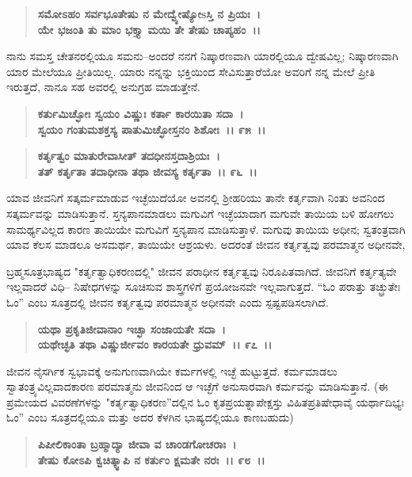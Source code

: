 \begin{verse}
\textbf{ಸಮೋಽಹಂ ಸರ್ವಭೂತೇಷು ನ ಮೇದ್ವ್ಯೇಷ್ಯೋsಸ್ತಿ ನ ಪ್ರಿಯಃ~।}\\\textbf{ಯೇ ಭಜಂತಿ ತು ಮಾಂ ಭಕ್ತ್ಯಾ ಮಯಿ ತೇ ತೇಷು ಚಾಪ್ಯಹಂ~।।} 
\end{verse}

ನಾನು ಸಮಸ್ತ ಚೇತನರಲ್ಲಿಯೂ ಸಮನು–ಅಂದರೆ ನನಗೆ ನಿಷ್ಕಾರಣವಾಗಿ ಯಾರಲ್ಲಿಯೂ ದ್ವೇಷವಿಲ್ಲ; ನಿಷ್ಕಾರಣವಾಗಿ ಯಾರ ಮೇಲೆಯೂ ಪ್ರೀತಿಯಿಲ್ಲ. ಯಾರು ನನ್ನನ್ನು ಭಕ್ತಿಯಿಂದ ಸೇವಿಸುತ್ತಾರೆಯೋ ಅವರಿಗೆ ನನ್ನ ಮೇಲೆ ಪ್ರೀತಿ ಇರುತ್ತದೆ, ನಾನೂ ಸಹ ಅವರಲ್ಲಿ ಅನುಗ್ರಹ ಮಾಡುತ್ತೇನೆ.

\begin{verse}
\textbf{ಕರ್ತುಮಿಚ್ಛೋಃ ಸ್ವಯಂ ವಿಷ್ಣುಃ ಕರ್ತಾ ಕಾರಯಿತಾ ಸದಾ~।}\\\textbf{ಸ್ವಯಂ ಗಂತುಮಶಕ್ತಸ್ಯ ಪಾತುಮಿಚ್ಛೋಸ್ತನಂ ಶಿಶೋಃ~।। ೯೫~।।} 
\end{verse}

\begin{verse}
\textbf{ಕರ್ತೃತ್ವಂ ಮಾತುರೇವಾಸೀತ್ ತದಧೀನಸ್ತದಾಶ್ರಿಯಃ~।}\\\textbf{ತತ್ ಕರ್ತೃತಾ ತದಾಧೀನಾ ತಥಾ ಜೀವಸ್ಯ ಕರ್ತೃತಾ~।। ೯೬~।।}
\end{verse}

ಯಾವ ಜೀವನಿಗೆ ಸತ್ಕರ್ಮಮಾಡುವ ಇಚ್ಛೆಯಿದೆಯೋ ಅವನಲ್ಲಿ ಶ‍್ರೀಹರಿಯು ತಾನೇ ಕರ್ತೃವಾಗಿ ನಿಂತು ಅವನಿಂದ ಸತ್ಕರ್ಮವನ್ನು ಮಾಡಿಸುತ್ತಾನೆ. ಸ್ತನ್ಯಪಾನಮಾಡಲು ಮಗುವಿಗೆ ಇಚ್ಛೆಯಾದಾಗ ಮಗುವೇ ತಾಯಿಯ ಬಳಿ ಹೋಗಲು ಸಾಮರ್ಥ್ಯವಿಲ್ಲದ ಕಾರಣ ತಾಯಿಯೇ ಮಗುವಿಗೆ ಸ್ತನ್ಯಪಾನ ಮಾಡಿಸುತ್ತಾಳೆ. ಮಗುವು ತಾಯಿಯ ಅಧೀನ; ಸ್ವತಂತ್ರವಾಗಿ ಯಾವ ಕೆಲಸ ಮಾಡಲೂ ಅಸಮರ್ಥ, ತಾಯಿಯೇ ಆಶ್ರಯಳು. ಅದರಂತೆ ಜೀವನ ಕರ್ತೃತ್ವವು ಪರಮಾತ್ಮನ ಅಧೀನವೇ,

ಬ್ರಹ್ಮಸೂತ್ರಭಾಷ್ಯದ "ಕರ್ತೃತ್ವಾಧಿಕರಣದಲ್ಲಿ" ಜೀವನ ಪರಾಧೀನ ಕರ್ತೃತ್ವವು ನಿರೂಪಿತವಾಗಿದೆ. ಜೀವನಿಗೆ ಕರ್ತೃತ್ಯವೇ ಇಲ್ಲವಾದರೆ ವಿಧಿ– ನಿಷೇಧಗಳನ್ನು ಸೂಚಿಸುವ ಶಾಸ್ತ್ರಗಳಿಗೆ ಪ್ರಯೋಜನವೇ ಇಲ್ಲವಾಗುತ್ತದೆ. “ಓಂ ಪರಾತ್ತು ತಚ್ಛ್ರುತೇಃ ಓಂ” ಎಂಬ ಸೂತ್ರದಲ್ಲಿ ಜೀವನ ಕರ್ತೃತ್ವವು ಪರಮಾತ್ಮನ ಅಧೀನವೇ ಎಂದು ಸ್ಪಷ್ಟಪಡಿಸಲಾಗಿದೆ.

\begin{verse}
\textbf{ಯಥಾ ಪ್ರಕೃತಿಜೀವಾನಾಂ ಇಚ್ಛಾ ಸಂಜಾಯತೇ ಸದಾ~।}\\\textbf{ಯಥೇಚ್ಛತಿ ತಥಾ ವಿಷ್ಣುರ್ಜೀವಂ ಕಾರಯತೇ ಧ್ರುವಮ್~।। ೯೭~।।}
\end{verse}

ಜೀವನ ನೈಸರ್ಗಿಕ ಸ್ವಭಾವಕ್ಕೆ ಅನುಗುಣವಾಗಿಯೇ ಕರ್ಮಗಳಲ್ಲಿ ಇಚ್ಛೆ ಹುಟ್ಟುತ್ತದೆ. ಕರ್ಮಮಾಡಲು ಸ್ವಾತಂತ್ರ್ಯವಿಲ್ಲವಾದಕಾರಣ ಪರಮಾತ್ಮನು ಜೀವನಿಂದ ಆ ಇಚ್ಛೆಗೆ ಅನುಸಾರವಾಗಿ ಕರ್ಮವನ್ನು ಮಾಡಿಸುತ್ತಾನೆ. (ಈ ಪ್ರಮೇಯದ ವಿವರಣೆಗಳನ್ನು "ಕರ್ತೃತ್ವಾಧಿಕರಣ”ದಲ್ಲಿನ ಓಂ ಕೃತಪ್ರಯತ್ನಾಪೇಕ್ಷಸ್ತು ವಿಹಿತಪ್ರತಿಷೇಧಾವೈ ಯರ್ಥಾದಿಭ್ಯಃ ಓಂ” ಎಂಬ ಸೂತ್ರದಲ್ಲಿಯೂ ಮತ್ತು ಅದರ ಕೆಳಗಿನ ಭಾಷ್ಯದಲ್ಲಿಯೂ ಕಾಣಬಹುದು)

\begin{verse}
\textbf{ಪಿಪೀಲಿಕಾಂತಾ ಬ್ರಹ್ಮಾದ್ಯಾ ಜೀವಾ ವ ಚಾಂಡಗೋಚರಾಃ~।}\\\textbf{ತೇಷು ಕೋಽಪಿ ಕ್ವಚಿತ್ಕ್ವಾಪಿ ನ ಕರ್ತುಂ ಕ್ಷಮತೇ ನರಃ~।। ೯೮~।।}
\end{verse}

